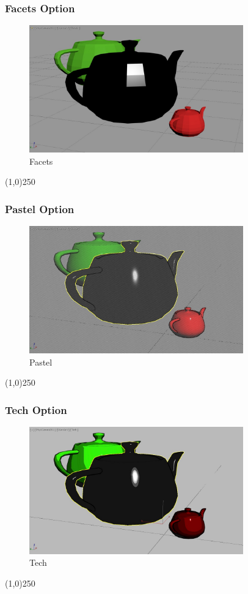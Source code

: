 \begin{frame}
\frametitle{Facets Option}
\begin{figure}
	\centering
	\includegraphics[height=5.5cm]{img/ViewportOptions/Facets.jpg}
	\caption{Facets}
	\label{fig:Facets}
\end{figure}
\end{frame}
\begin{center}\line(1,0){250}\end{center}



\begin{frame}
\frametitle{Pastel Option}
\begin{figure}
	\centering
	\includegraphics[height=5.5cm]{img/ViewportOptions/Pastel.jpg}
	\caption{Pastel}
	\label{fig:Pastel}
\end{figure}
\end{frame}
\begin{center}\line(1,0){250}\end{center}


\begin{frame}
\frametitle{Tech Option}
\begin{figure}
	\centering
	\includegraphics[height=5.5cm]{img/ViewportOptions/Tech.jpg}
	\caption{Tech}
	\label{fig:Tech}
\end{figure}
\end{frame}
\begin{center}\line(1,0){250}\end{center}






